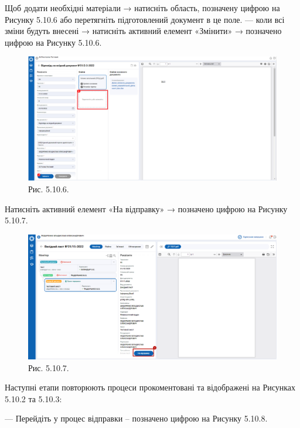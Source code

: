 Щоб додати необхідні матеріали → натисніть область, позначену цифрою
 на Рисунку 5.10.6 або перетягніть підготовлений документ в це поле.
--- коли всі зміни будуть внесені → натисніть активний елемент «Змінити» →
позначено цифрою  на Рисунку 5.10.6.

\begin{figure}[!htbp]
\centerline{\includegraphics[width=\textwidth]{img/5.10.6.png}}
\caption{Рис. 5.10.6. }
\end{figure}

Натисніть активний елемент «На відправку» → позначено цифрою  на Рисунку 5.10.7.

\begin{figure}[!htbp]
\centerline{\includegraphics[width=\textwidth]{img/5.10.7.png}}
\caption{Рис. 5.10.7. }
\end{figure}

Наступні етапи повторюють процеси прокоментовані та відображені на Рисунках
5.10.2 та 5.10.3:

--- Перейдіть у процес відправки – позначено цифрою  на Рисунку 5.10.8.

